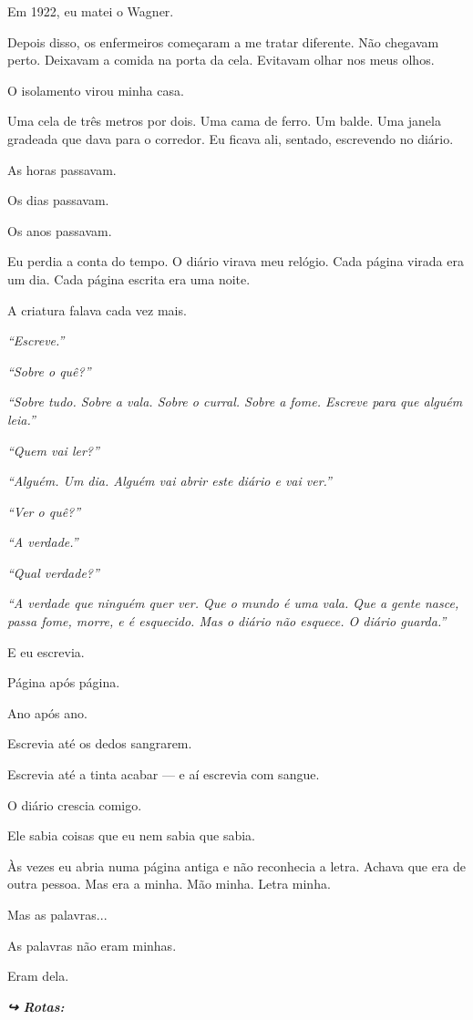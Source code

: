 \noindent Em 1922, eu matei o Wagner.

\noindent Depois disso, os enfermeiros começaram a me tratar diferente. Não chegavam perto. Deixavam a comida na porta da cela. Evitavam olhar nos meus olhos.

\noindent O isolamento virou minha casa.

\noindent Uma cela de três metros por dois. Uma cama de ferro. Um balde. Uma janela gradeada que dava para o corredor. Eu ficava ali, sentado, escrevendo no diário.

\noindent As horas passavam.

\noindent Os dias passavam.

\noindent Os anos passavam.

\noindent Eu perdia a conta do tempo. O diário virava meu relógio. Cada página virada era um dia. Cada página escrita era uma noite.

\noindent A criatura falava cada vez mais.

\noindent \textit{\textquotedblleft{}Escreve.\textquotedblright{}}

\noindent \textit{\textquotedblleft{}Sobre o quê?\textquotedblright{}}

\noindent \textit{\textquotedblleft{}Sobre tudo. Sobre a vala. Sobre o curral. Sobre a fome. Escreve para que alguém leia.\textquotedblright{}}

\noindent \textit{\textquotedblleft{}Quem vai ler?\textquotedblright{}}

\noindent \textit{\textquotedblleft{}Alguém. Um dia. Alguém vai abrir este diário e vai ver.\textquotedblright{}}

\noindent \textit{\textquotedblleft{}Ver o quê?\textquotedblright{}}

\noindent \textit{\textquotedblleft{}A verdade.\textquotedblright{}}

\noindent \textit{\textquotedblleft{}Qual verdade?\textquotedblright{}}

\noindent \textit{\textquotedblleft{}A verdade que ninguém quer ver. Que o mundo é uma vala. Que a gente nasce, passa fome, morre, e é esquecido. Mas o diário não esquece. O diário guarda.\textquotedblright{}}

\noindent E eu escrevia.

\noindent Página após página.

\noindent Ano após ano.

\noindent Escrevia até os dedos sangrarem.

\noindent Escrevia até a tinta acabar --- e aí escrevia com sangue.

\noindent O diário crescia comigo.

\noindent Ele sabia coisas que eu nem sabia que sabia.

\noindent Às vezes eu abria numa página antiga e não reconhecia a letra. Achava que era de outra pessoa. Mas era a minha. Mão minha. Letra minha.

\noindent Mas as palavras...

\noindent As palavras não eram minhas.

\noindent Eram dela.

\vspace{0.5em}
\noindent\textit{\textbf{↪ Rotas:}  \rotasep {}}